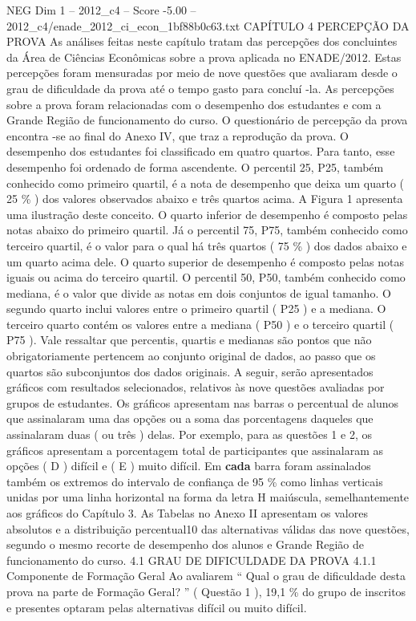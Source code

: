 \begin{textsample}{NEG Dim 1 – 2012\_c4 – Score -5.00 – 2012\_c4/enade\_2012\_ci\_econ\_1bf88b0c63.txt}  \label{ex:f1_neg_077}
CAPÍTULO 4 PERCEPÇÃO DA PROVA As análises feitas neste capítulo tratam das percepções dos concluintes da Área de Ciências Econômicas sobre a prova aplicada no ENADE/2012.
Estas percepções foram mensuradas por meio de nove questões que avaliaram desde o grau de dificuldade da prova até o tempo gasto para concluí -la.
As percepções sobre a prova foram relacionadas com o desempenho dos estudantes e com a Grande Região de funcionamento do curso.
O questionário de percepção da prova encontra -se ao final do Anexo IV, que traz a reprodução da prova.
O desempenho dos estudantes foi classificado em quatro quartos.
Para tanto, esse desempenho foi ordenado de forma ascendente.
O percentil 25, P25, também conhecido como primeiro quartil, é a nota de desempenho que deixa um quarto ( 25 \% ) dos valores observados abaixo e três quartos acima.
A Figura 1 apresenta uma ilustração deste conceito.
O quarto inferior de desempenho é composto pelas notas abaixo do primeiro quartil.
Já o percentil 75, P75, também conhecido como terceiro quartil, é o valor para o qual há três quartos ( 75 \% ) dos dados abaixo e um quarto acima dele.
O quarto superior de desempenho é composto pelas notas iguais ou acima do terceiro quartil.
O percentil 50, P50, também conhecido como mediana, é o valor que divide as notas em dois conjuntos de igual tamanho.
O segundo quarto inclui valores entre o primeiro quartil ( P25 ) e a mediana.
O terceiro quarto contém os valores entre a mediana ( P50 ) e o terceiro quartil ( P75 ).
Vale ressaltar que percentis, quartis e medianas são pontos que não obrigatoriamente pertencem ao conjunto original de dados, ao passo que os quartos são subconjuntos dos dados originais.
A seguir, serão apresentados gráficos com resultados selecionados, relativos às nove questões avaliadas por grupos de estudantes.
Os gráficos apresentam nas barras o percentual de alunos que assinalaram uma das opções ou a soma das porcentagens daqueles que assinalaram duas ( ou três ) delas.
Por exemplo, para as questões 1 e 2, os gráficos apresentam a porcentagem total de participantes que assinalaram as opções ( D ) difícil e ( E ) muito difícil.
Em \textbf{cada} barra foram assinalados também os extremos do intervalo de confiança de 95 \% como linhas verticais unidas por uma linha horizontal na forma da letra H maiúscula, semelhantemente aos gráficos do Capítulo 3.
As Tabelas no Anexo II apresentam os valores absolutos e a distribuição percentual10 das alternativas válidas das nove questões, segundo o mesmo recorte de desempenho dos alunos e Grande Região de funcionamento do curso. 4.1 GRAU DE DIFICULDADE DA PROVA 4.1.1 Componente de Formação Geral Ao avaliarem “ Qual o grau de dificuldade desta prova na parte de Formação Geral? ” ( Questão 1 ), 19,1 \% do grupo de inscritos e presentes optaram pelas alternativas difícil ou muito difícil.

\end{textsample}
